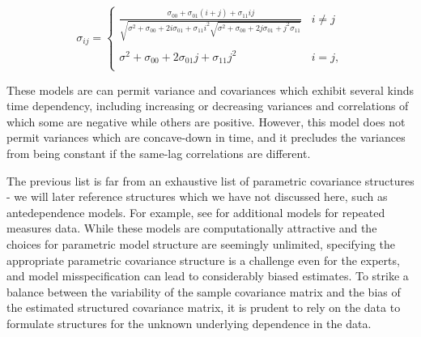 \documentclass[../chapter-1-introduction.tex]{subfiles}
\begin{document}
\begin{equation}
\sigma_{ij} = \left\{ \begin{array}{ll}
\frac{\sigma_{00} + \sigma_{01}\left(i + j\right) + \sigma_{11} ij}{\sqrt{\sigma^2 + \sigma_{00} + 2i\sigma_{01} + \sigma_{11}i^2\sqrt{\sigma^2 + \sigma_{00} + 2j\sigma_{01} +j^2\sigma_{11}} }} &  i \ne j \\ 
& \\
\sigma^2 + \sigma_{00} + 2\sigma_{01}j + \sigma_{11}j^2 &  i= j, \\
\end{array}\right.
\end{equation}
\newline

These models are can permit variance and covariances which exhibit several kinds time dependency, including increasing or decreasing variances and correlations of which some are negative while others are positive. However, this model does not permit variances which are concave-down in time, and it precludes the variances from being constant if the same-lag correlations are different.

\bigskip

The previous list is far from an exhaustive list of parametric covariance structures - we will later reference structures which we have not discussed here, such as antedependence models. For example, see \citet{jennrich1986unbalanced} for additional models for repeated measures data. While these models are computationally attractive and the choices for parametric model structure are seemingly unlimited, specifying the appropriate parametric covariance structure is a challenge even for the experts, and model misspecification can lead to considerably biased estimates. To strike a balance between the variability of the sample covariance matrix and the bias of the estimated structured covariance matrix, it is prudent to rely on the data to formulate structures for the unknown underlying dependence in the data.
\end{document}
